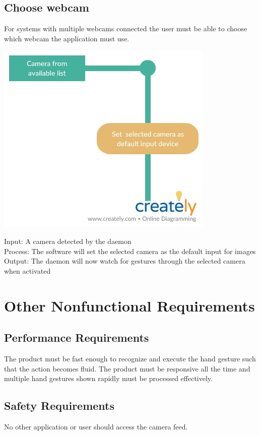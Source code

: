 \documentclass{scrreprt}
\begin{document}
\newpage
 \section{Choose webcam}
For systems with multiple webcams connected the user must be able to choose which webcam the application must use.
\begin{center}
    \includegraphics[scale=0.5]{camera.png}
\end{center}
Input: A camera detected by the daemon
\\Process: The software will set the selected camera as the default input for images
\\Output: The daemon will now watch for gestures through the selected camera when activated

\chapter{Other Nonfunctional Requirements}

\section{Performance Requirements}
The product must be fast enough to recognize and execute the hand gesture such that the action becomes fluid. The product must be responsive all the time and multiple hand gestures shown rapidly must be processed effectively.

\section{Safety Requirements}
No other application or user should access the camera feed.
\end{document}
